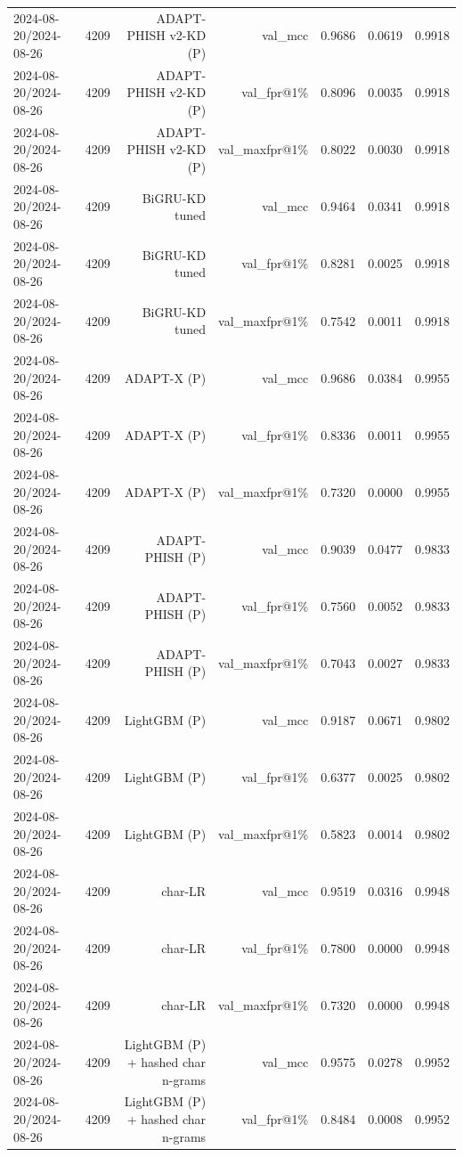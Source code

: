 \begin{table}[t]
\begin{tabular}{llrrrrr}
2024-08-20/2024-08-26 & 4209 & ADAPT-PHISH v2-KD (P) & val\_mcc & 0.9686 & 0.0619 & 0.9918 \\
2024-08-20/2024-08-26 & 4209 & ADAPT-PHISH v2-KD (P) & val\_fpr@1\% & 0.8096 & 0.0035 & 0.9918 \\
2024-08-20/2024-08-26 & 4209 & ADAPT-PHISH v2-KD (P) & val\_maxfpr@1\% & 0.8022 & 0.0030 & 0.9918 \\
2024-08-20/2024-08-26 & 4209 & BiGRU-KD tuned & val\_mcc & 0.9464 & 0.0341 & 0.9918 \\
2024-08-20/2024-08-26 & 4209 & BiGRU-KD tuned & val\_fpr@1\% & 0.8281 & 0.0025 & 0.9918 \\
2024-08-20/2024-08-26 & 4209 & BiGRU-KD tuned & val\_maxfpr@1\% & 0.7542 & 0.0011 & 0.9918 \\
2024-08-20/2024-08-26 & 4209 & ADAPT-X (P) & val\_mcc & 0.9686 & 0.0384 & 0.9955 \\
2024-08-20/2024-08-26 & 4209 & ADAPT-X (P) & val\_fpr@1\% & 0.8336 & 0.0011 & 0.9955 \\
2024-08-20/2024-08-26 & 4209 & ADAPT-X (P) & val\_maxfpr@1\% & 0.7320 & 0.0000 & 0.9955 \\
2024-08-20/2024-08-26 & 4209 & ADAPT-PHISH (P) & val\_mcc & 0.9039 & 0.0477 & 0.9833 \\
2024-08-20/2024-08-26 & 4209 & ADAPT-PHISH (P) & val\_fpr@1\% & 0.7560 & 0.0052 & 0.9833 \\
2024-08-20/2024-08-26 & 4209 & ADAPT-PHISH (P) & val\_maxfpr@1\% & 0.7043 & 0.0027 & 0.9833 \\
2024-08-20/2024-08-26 & 4209 & LightGBM (P) & val\_mcc & 0.9187 & 0.0671 & 0.9802 \\
2024-08-20/2024-08-26 & 4209 & LightGBM (P) & val\_fpr@1\% & 0.6377 & 0.0025 & 0.9802 \\
2024-08-20/2024-08-26 & 4209 & LightGBM (P) & val\_maxfpr@1\% & 0.5823 & 0.0014 & 0.9802 \\
2024-08-20/2024-08-26 & 4209 & char-LR & val\_mcc & 0.9519 & 0.0316 & 0.9948 \\
2024-08-20/2024-08-26 & 4209 & char-LR & val\_fpr@1\% & 0.7800 & 0.0000 & 0.9948 \\
2024-08-20/2024-08-26 & 4209 & char-LR & val\_maxfpr@1\% & 0.7320 & 0.0000 & 0.9948 \\
2024-08-20/2024-08-26 & 4209 & LightGBM (P) + hashed char n-grams & val\_mcc & 0.9575 & 0.0278 & 0.9952 \\
2024-08-20/2024-08-26 & 4209 & LightGBM (P) + hashed char n-grams & val\_fpr@1\% & 0.8484 & 0.0008 & 0.9952 \\

\end{tabular}
\end{table}
